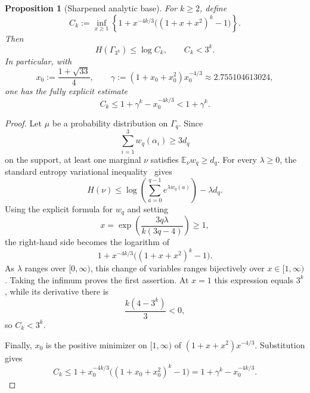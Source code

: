 \documentclass[10pt,a4paper]{amsart}
\newtheorem{proposition}[theorem]{Proposition}
\theoremstyle{definition}
\newcommand{\1}{\mathbf 1}
\begin{document}
\begin{proposition}[Sharpened analytic base]\label{prop:q3-sharp-base}
For $k\ge2$, define
\[
 C_k:=\inf_{x\ge1}
 \left\{
 1+x^{-4k/3}\bigl((1+x+x^2)^k-1\bigr)
 \right\}.
\]
Then
\[
 H(\Gamma_{3^k})\le\log C_k,
 \qquad C_k<3^k.
\]
In particular, with
\[
 x_0:=\frac{1+\sqrt{33}}4,
 \qquad
 \gamma:=(1+x_0+x_0^2)x_0^{-4/3}
          \approx2.755104613024,
\]
one has the fully explicit estimate
\[
 C_k
 \le1+\gamma^k-x_0^{-4k/3}
 <1+\gamma^k.
\]
\end{proposition}

\begin{proof}
Let $\mu$ be a probability distribution on $\Gamma_q$.  Since
\[
 \sum_{i=1}^3w_q(\alpha_i)\ge3d_q
\]
on the support, at least one marginal $\nu$ satisfies
$\mathbb E_\nu w_q\ge d_q$.  For every $\lambda\ge0$, the standard entropy variational inequality~\cite{CoverThomas} gives
\[
 H(\nu)
 \le\log\left(\sum_{a=0}^{q-1}e^{\lambda w_q(a)}\right)
      -\lambda d_q.
\]
Using the explicit formula for $w_q$ and setting
\[
 x=\exp\!\left(\frac{3q\lambda}{k(3q-4)}\right)\ge1,
\]
the right-hand side becomes the logarithm of
\[
 1+x^{-4k/3}\bigl((1+x+x^2)^k-1\bigr).
\]
As $\lambda$ ranges over $[0,\infty)$, this change of variables ranges bijectively over $x\in[1,\infty)$.  Taking the infimum proves the first assertion.  At $x=1$ this expression equals $3^k$, while its derivative there is
\[
 \frac{k(4-3^k)}3<0,
\]
so $C_k<3^k$.

Finally, $x_0$ is the positive minimizer on $[1,\infty)$ of
$(1+x+x^2)x^{-4/3}$.  Substitution gives
\[
 C_k
 \le1+x_0^{-4k/3}\bigl((1+x_0+x_0^2)^k-1\bigr)
 =1+\gamma^k-x_0^{-4k/3}.
\]
\end{proof}
\end{document}
